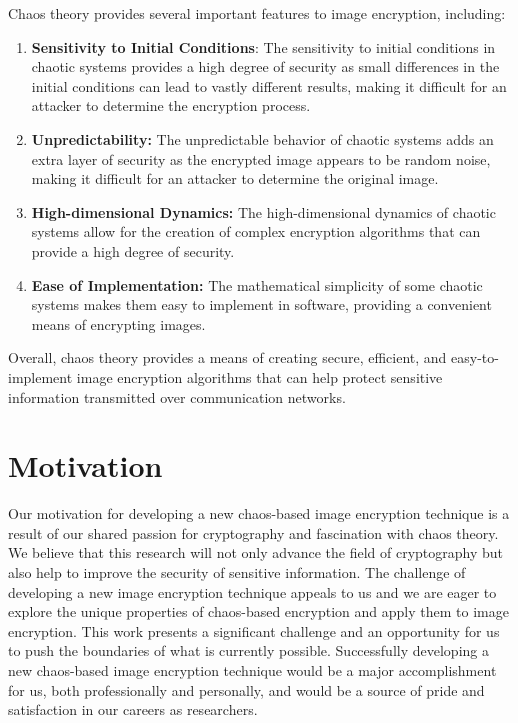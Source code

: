 \documentclass[12pt,a4paper,english]{article}
\begin{document}
Chaos theory provides several important features to image encryption, including:
\begin{enumerate}
    \item \textbf{Sensitivity to Initial Conditions}: The sensitivity to initial conditions in chaotic systems provides a high degree of security as small differences in the initial conditions can lead to vastly different results, making it difficult for an attacker to determine the encryption process.
    \item \textbf{Unpredictability:} The unpredictable behavior of chaotic systems adds an extra layer of security as the encrypted image appears to be random noise, making it difficult for an attacker to determine the original image.
    \item \textbf{High-dimensional Dynamics:} The high-dimensional dynamics of chaotic systems allow for the creation of complex encryption algorithms that can provide a high degree of security.
    \item \textbf{Ease of Implementation:} The mathematical simplicity of some chaotic systems makes them easy to implement in software, providing a convenient means of encrypting images.
\end{enumerate}
Overall, chaos theory provides a means of creating secure, efficient, and easy-to-implement image encryption algorithms that can help protect sensitive information transmitted over communication networks.
\newpage
\section{Motivation}
Our motivation for developing a new chaos-based image encryption technique is a result of our shared passion for cryptography and fascination with chaos theory. We believe that this research will not only advance the field of cryptography but also help to improve the security of sensitive information. The challenge of developing a new image encryption technique appeals to us and we are eager to explore the unique properties of chaos-based encryption and apply them to image encryption. This work presents a significant challenge and an opportunity for us to push the boundaries of what is currently possible. Successfully developing a new chaos-based image encryption technique would be a major accomplishment for us, both professionally and personally, and would be a source of pride and satisfaction in our careers as researchers.
\paragraph{}
\newpage
\end{document}
